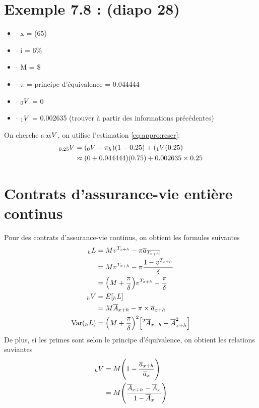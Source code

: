 \documentclass[11pt,french]{report}
\makeatletter
\DeclareRobustCommand{\annuity}[1]{%
\def\arraystretch{0}%
\setlength\arraycolsep{.7pt}%
\setlength\arrayrulewidth{.3pt}%
\begin{array}[b]{@{}c|}\hline
\\[\arraycolsep]%
\scriptstyle #1%
\end{array}%
}
\newcommand{\indiceGauche}[2]{{\vphantom{#2}}_{#1}#2}
\makeatother
\begin{document}
\section{Exemple 7.8 : (diapo 28)}
\begin{itemize}
\item $ \cdot $ x = (65)
\item $ \cdot $ i = 6\%
\item $ \cdot $ M = \$
\item $ \cdot $ $\pi$ = principe d'équivalence = 0.044444
\item $ \cdot $ $\indiceGauche{0}{V}$ = 0
\item $ \cdot $ $\indiceGauche{1}{V}$ = 0.002635 (trouver à partir des informations précédentes)
\end{itemize}
On cherche $\indiceGauche{0.25}{V}$, on utilise l'estimation \ref{eq:appro:reser}:
\begin{align*}
\indiceGauche{0.25}{V} &= (\indiceGauche{0}{V} + \pi_h)(1-0.25) + (\indiceGauche{1}{V}(0.25)\\
&\approx (0+0.044444)(0.75) + 0.002635 \times  0.25
\end{align*}

\section{Contrats d'assurance-vie entière continus}
Pour des contrats d'assurance-vie continus, on obtient les formules suivantes 
\begin{align*}
\indiceGauche{h}{L} &= M v^{T_{x+h}} - \pi \overline{a}_{\annuity{T_{x+h}}} \\
&= M v^{T_{x+h}} - \pi \frac{1 - v^{T_{x+h}}}{\delta}\\
&= \Big( M + \frac{\pi}{\delta}\Big) v^{T_{x+h}} - \frac{\pi}{\delta} \\
\indiceGauche{h}{V} &= E[\indiceGauche{h}{L}] \\
&= M \overline{A}_{x+h} - \pi \times \overline{a}_{x+h}\\
\text{Var}(\indiceGauche{h}{L}) &= \Big( M + \frac{\pi}{\delta}\Big)^2 \Big[{}^2\overline{A}_{x+h} - \overline{A}_{x+h}^2 \Big]
\end{align*}
De plus, si les primes sont selon le principe d'équivalence, on obtient les relations suviantes
\begin{align*}
\indiceGauche{h}{V} &= M \Bigg( 1 - \frac{\overline{a}_{x+h}}{\overline{a}_{x}} \Bigg) \\
&= M \Bigg( \frac{\overline{A}_{x+h} - \overline{A}_{x}}{1 - \overline{A}_{x}}\Bigg)
\end{align*}
\end{document}

